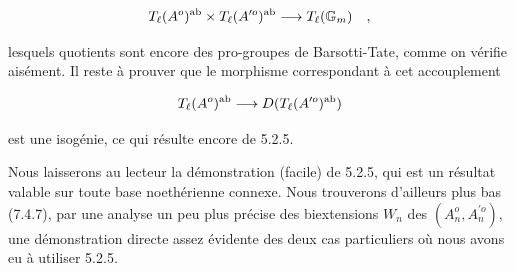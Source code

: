 \[
T_{\ell}(A^o)^{\mathrm{ab}}\times T_{\ell}(A^{\prime o})^{\mathrm{ab}} \longrightarrow T_{\ell}(\mathbb{G}_m)\quad ,
\]

lesquels quotients sont encore des pro-groupes de Barsotti-Tate, comme on vérifie aisément. Il reste à prouver que le morphisme correspondant à cet accouplement

\[
T_{\ell}(A^o)^{\mathrm{ab}} \longrightarrow D(T_{\ell}(A^{\prime o})^{\mathrm{ab}})
\]

est une isogénie, ce qui résulte  encore de 5.2.5.

Nous laisserons au lecteur la démonstration (facile) de 5.2.5, qui est un résultat valable sur toute base noethérienne connexe. Nous trouverons d'ailleurs plus bas (7.4.7), par une analyse un peu plus précise des biextensions $W_n$ des $(A^o_n,A^{\prime o}_n)$, une démonstration directe assez évidente des deux cas particuliers où nous avons eu à utiliser 5.2.5.

